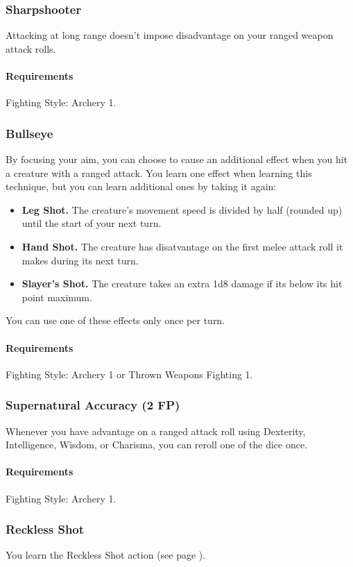 \subsubsection{Sharpshooter} \label{feat::sharpshooter}
    Attacking at long range doesn't impose disadvantage on your ranged weapon attack rolls.
    \paragraph{Requirements} Fighting Style: Archery 1.
\subsubsection{Bullseye} \label{feat::bullseye}
    By focusing your aim, you can choose to cause an additional effect when you hit a creature with a ranged attack.
    You learn one effect when learning this technique, but you can learn additional ones by taking it again:
    \begin{itemize}
        \item \textbf{Leg Shot.} The creature's movement speed is divided by half (rounded up) until the start of your next turn.
        \item \textbf{Hand Shot.} The creature has disatvantage on the first melee attack roll it makes during its next turn.
        \item \textbf{Slayer's Shot.} The creature takes an extra 1d8 damage if its below its hit point maximum.
    \end{itemize}

    You can use one of these effects only once per turn.
    \paragraph{Requirements} Fighting Style: Archery 1 or Thrown Weapons Fighting 1.
\subsubsection{Supernatural Accuracy (2 FP)} \label{feat::supernaturalaccuracy}
    Whenever you have advantage on a ranged attack roll using Dexterity, Intelligence, Wisdom, or Charisma, you can reroll one of the dice once.
    \paragraph{Requirements} Fighting Style: Archery 1.
\subsubsection{Reckless Shot} \label{feat::recklessshot}
    You learn the Reckless Shot action (see page \pageref{act::recklessshot}).
